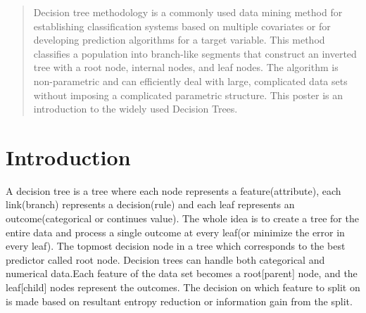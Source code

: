 \documentclass[a0,portrait]{a0poster}
\begin{document}

\begin{multicols}{3} %


\color{Navy} %

\begin{abstract}
Decision tree methodology is a commonly used data mining method for establishing classification systems based on multiple covariates or for developing prediction algorithms for a target variable. This method classifies a population into branch-like segments that construct an inverted tree with a root node, internal nodes, and leaf nodes. The algorithm is non-parametric and can efficiently deal with large, complicated data sets without imposing a complicated parametric structure. This poster is an introduction to the widely used Decision Trees.
\end{abstract}

\color{Black} %
\section*{Introduction}
A decision tree is a tree where each node represents a feature(attribute), each link(branch) represents a decision(rule) and each leaf represents an outcome(categorical or continues value).
The whole idea is to create a tree for the entire data and process a single outcome at every leaf(or minimize the error in every leaf). The topmost decision node in a tree which corresponds to the best predictor called root node. Decision trees can handle both categorical and numerical data.Each feature of the data set becomes a root[parent] node, and the leaf[child] nodes represent the outcomes. The decision on which feature to split on is made based on resultant entropy reduction or information gain from the split.



\end{multicols}
\end{document}

